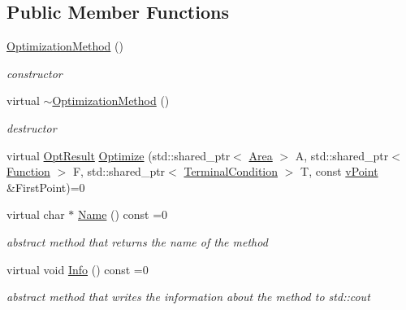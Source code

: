 \subsection*{Public Member Functions}
\begin{DoxyCompactItemize}
\item 
\mbox{\label{class_optimization_method_a8490a7cd0e3334f7e61469377c7d4217}} 
\hyperlink{class_optimization_method_a8490a7cd0e3334f7e61469377c7d4217}{Optimization\+Method} ()
\begin{DoxyCompactList}\small\item\em constructor \end{DoxyCompactList}\item 
\mbox{\label{class_optimization_method_ab33ddd12499ebedbc73f125a65a21442}} 
virtual \hyperlink{class_optimization_method_ab33ddd12499ebedbc73f125a65a21442}{$\sim$\+Optimization\+Method} ()
\begin{DoxyCompactList}\small\item\em destructor \end{DoxyCompactList}\item 
virtual \hyperlink{struct_opt_result}{Opt\+Result} \hyperlink{class_optimization_method_a98a1e917667c3ca851cbcd9068b0a9d9}{Optimize} (std\+::shared\+\_\+ptr$<$ \hyperlink{class_area}{Area} $>$ A, std\+::shared\+\_\+ptr$<$ \hyperlink{class_function}{Function} $>$ F, std\+::shared\+\_\+ptr$<$ \hyperlink{class_terminal_condition}{Terminal\+Condition} $>$ T, const \hyperlink{classv_point}{v\+Point} \&First\+Point)=0
\item 
\mbox{\label{class_optimization_method_a2bb0f33d599675937787db8bd17197c1}} 
virtual char $\ast$ \hyperlink{class_optimization_method_a2bb0f33d599675937787db8bd17197c1}{Name} () const =0
\begin{DoxyCompactList}\small\item\em abstract method that returns the name of the method \end{DoxyCompactList}\item 
\mbox{\label{class_optimization_method_adc3fa59ab209fd11044696319b45cf2a}} 
virtual void \hyperlink{class_optimization_method_adc3fa59ab209fd11044696319b45cf2a}{Info} () const =0
\begin{DoxyCompactList}\small\item\em abstract method that writes the information about the method to std\+::cout \end{DoxyCompactList}\end{DoxyCompactItemize}
